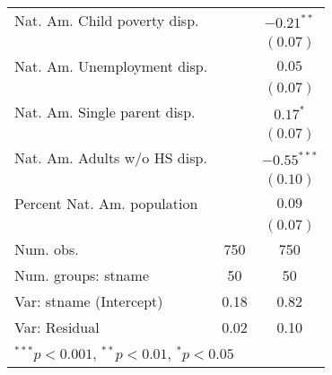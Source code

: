 \begin{table}
\begin{center}
\begin{tabular}{l c c }
Nat. Am. Child poverty disp. &              & $-0.21^{**}$  \\
                             &              & $(0.07)$      \\
Nat. Am. Unemployment disp.  &              & $0.05$        \\
                             &              & $(0.07)$      \\
Nat. Am. Single parent disp. &              & $0.17^{*}$    \\
                             &              & $(0.07)$      \\
Nat. Am. Adults w/o HS disp. &              & $-0.55^{***}$ \\
                             &              & $(0.10)$      \\
Percent Nat. Am. population  &              & $0.09$        \\
                             &              & $(0.07)$      \\
\hline
Num. obs.                    & 750          & 750           \\
Num. groups: stname          & 50           & 50            \\
Var: stname (Intercept)      & 0.18         & 0.82          \\
Var: Residual                & 0.02         & 0.10          \\
\hline
\multicolumn{3}{l}{\scriptsize{$^{***}p<0.001$, $^{**}p<0.01$, $^*p<0.05$}}
\end{tabular}
\label{disp-models}
\end{center}
\end{table}
